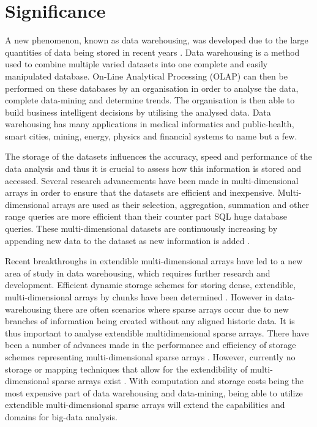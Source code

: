 \section{Significance}
A new phenomenon, known as data warehousing, was developed due to the large quantities of data being stored in recent years \cite{golfarelli:2009:dwd}. Data warehousing is a method used to combine multiple varied datasets into one complete and easily manipulated database. On-Line Analytical Processing (OLAP) can then be performed on these databases by an organisation in order to analyse the data, complete data-mining and determine trends. The organisation is then able to build business intelligent decisions by utilising the analysed data. Data warehousing has many applications in medical informatics and public-health, smart cities, mining, energy, physics and financial systems to name but a few.

The storage of the datasets influences the accuracy, speed and performance of the data analysis and thus it is crucial to assess how this information is stored and accessed. Several research advancements have been made in multi-dimensional arrays in order to ensure that the datasets are efficient and inexpensive. Multi-dimensional arrays are used as their selection, aggregation, summation and other range queries are more efficient than their counter part SQL huge database queries. These multi-dimensional datasets are continuously increasing by appending new data to the dataset as new information is added \cite{otoo:2006:esa}.

Recent breakthroughs in extendible multi-dimensional arrays have led to a new area of study in data warehousing, which requires further research and development. Efficient dynamic storage schemes for storing dense, extendible, multi-dimensional arrays by chunks have been determined \cite{nimako:2012:ced,pedereira:2015:cas}. However in data-warehousing there are often scenarios where sparse arrays occur due to new branches of information being created without any aligned historic data. It is thus important to analyse extendible multidimensional sparse arrays. There have been a number of advances made in the performance and efficiency of storage schemes representing multi-dimensional sparse arrays \cite{otoo:2016:msa,goil:bess,otoo:2014:nas}. However, currently no storage or mapping techniques that allow for the extendibility of multi-dimensional sparse arrays exist \cite{nimako:2016:cea}. With computation and storage costs being the most expensive part of data warehousing and data-mining, being able to utilize extendible multi-dimensional sparse arrays will extend the capabilities and domains for big-data analysis.

